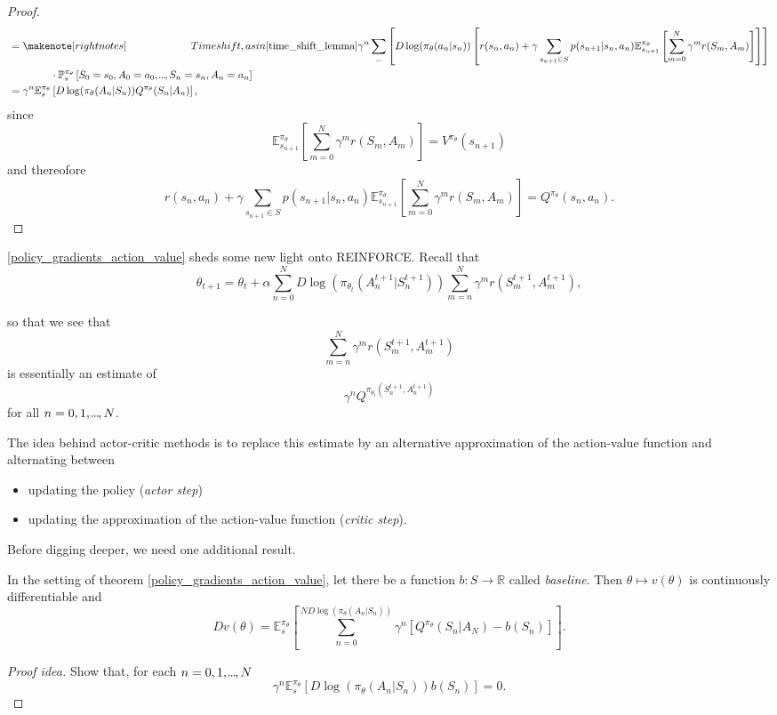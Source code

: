 \begin{proof}
\begin{align*}
        &= \note{\qquad \qquad \qquad \,Time shift, as in \cref{time_shift_lemma}} \gamma^n \sum_{\mydots} \left[ D \log(\pi_\theta(a_n | s_n)) \left[ r(s_n,a_n) + \gamma \sum_{s_{n+1} \in S} p(s_{n+1} | s_n, a_n) \mathbb{E}_{s_{n+1}}^{\pi_\theta} \left[ \sum_{m=0}^N \gamma^m r(S_m, A_m) \right] \right] \right]\\
        & \qquad \qquad \cdot \mathbb{P}_s^{\pi_\theta} \left[ S_{0}=s_{0}, A_{0}=a_{0},\mydots,S_n = s_n, A_n = a_n \right]\\
        &= \gamma^n \mathbb{E}_s^{\pi_\theta} \left[  D \log(\pi_{\theta}(A_n | S_n)) Q^{\pi_\theta}(S_n | A_n) \right],
    \end{align*} 
    since
    \[
        \mathbb{E}_{s_{n+1}}^{\pi_\theta} \left[ \sum_{m=0}^N \gamma^m r(S_m, A_m) \right] = V^{\pi_\theta}(s_{n+1})
    \]
    and thereofore 
    \[
        r(s_n,a_n) + \gamma \sum_{s_{n+1} \in S} p(s_{n+1} | s_n, a_n) \mathbb{E}_{s_{n+1}}^{\pi_\theta} \left[ \sum_{m=0}^N \gamma^m r(S_m, A_m) \right] = Q^{\pi_\theta}(s_n, a_n).
    \]
\end{proof}


\cref{policy_gradients_action_value} sheds some new light onto REINFORCE. Recall that 
\[
    \theta_{t+1} = \theta_t + \alpha \sum_{n=0}^{N} D \log(\pi_{\theta_{t}}(A_n^{t+1} | S_n^{t+1} )) \sum_{m=n}^N \gamma^m r(S_m^{t+1}, A_m^{t+1}),
\]

so that we see that 
\[
    \sum_{m=n}^N \gamma^m r(S_m^{t+1}, A_m^{t+1})
\]
is essentially an estimate of 
\[
    \gamma^n Q^{\pi_{\theta_{t}}(S_n^{t+1}, A_{n}^{t+1})}
\]
for all \( n=0,1,\kern-0.10em.\kern-0.06em.\kern-0.06em.\kern-0.1em,N \).

The idea behind actor-critic methods is to replace this estimate by an alternative approximation of the action-value function and alternating between 

\begin{itemize}
    \item updating the policy (\emph{actor step})
    \item updating the approximation of the action-value function (\emph{critic step}).
\end{itemize}

Before digging deeper, we need one additional result.

\begin{lemma}
    In the setting of theorem \cref{policy_gradients_action_value}, let there be a function \( b: S \to \mathbb{R} \) called \emph{baseline}. Then \( \theta \mapsto v(\theta) \) is continuously differentiable and 
    \[
        D v(\theta) = \mathbb{E}_s^{\pi_\theta} \left[ \sum_{n=0}^{N D \log(\pi_\theta (A_n | S_n))} \gamma^n \left[ Q^{\pi_\theta}(S_n | A_N) - b(S_n) \right] \right].
    \]
\end{lemma}
\begin{proof}[Proof idea]
Show that, for each \( n =  0,1,\kern-0.10em.\kern-0.06em.\kern-0.06em.\kern-0.1em,N \)
    \[
        \gamma^n \mathbb{E}_s^{\pi_\theta} \left[ D \log(\pi_\theta(A_n | S_n)) b(S_n) \right] = 0.
    \]
\end{proof}

